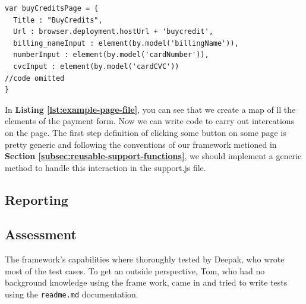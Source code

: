 \begin{listing}[H]
\begin{verbatim}
var buyCreditsPage = {
  Title : "BuyCredits",
  Url : browser.deployment.hostUrl + 'buycredit',
  billing_nameInput : element(by.model('billingName')),
  numberInput : element(by.model('cardNumber')),
  cvcInput : element(by.model('cardCVC'))
//code omitted
}
\end{verbatim}
\label{lst:example-page-file}
\end{listing}

In \textbf{Listing \ref{lst:example-page-file}}, you can see that we create a map of ll the elements of the payment form. Now we can write code to carry out intercations on the page. The first step definition of clicking some button on some page is pretty generic and following the conventions of our framework metioned in \textbf{Section \ref{subsec:reusable-support-functions}}, we should implement a generic method to handle this interaction in the support.js file.

\subsection{Reporting}
\label{subsec:reporting}

\subsection{Assessment}
\label{subsec:assessment}
The framework's capabilities where thoroughly tested by Deepak, who wrote most of the test cases. To get an outside perspective, Tom, who had no background knowledge using the frame work, came in and tried to write tests using the \texttt{readme.md} documentation.
